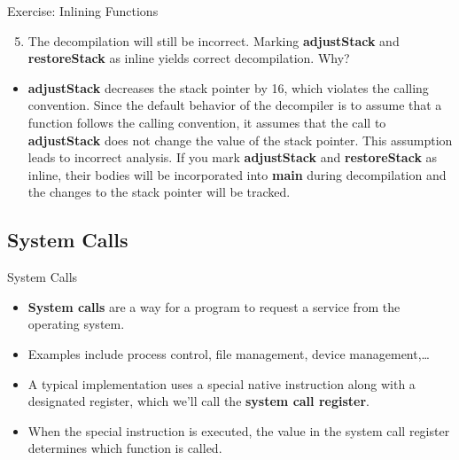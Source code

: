 \documentclass{beamer}
\begin{document}
\begin{frame}
\begin{block}{Exercise: Inlining Functions}
\begin{enumerate}
\setcounter{enumi}{4}
\item The decompilation will still be incorrect. Marking \textbf{adjustStack} and \textbf{restoreStack} as inline yields correct decompilation.  Why?
\end{enumerate}
\pause
\begin{itemize}
\item \textbf{adjustStack} decreases the stack pointer by 16, which violates the calling convention.  Since the default behavior of the decompiler is to assume that a function follows the
calling convention, it assumes that the call to \textbf{adjustStack} does not change the value of the stack pointer. This assumption leads to incorrect analysis. If you mark
\textbf{adjustStack} and \textbf{restoreStack} as inline, their bodies will be incorporated into \textbf{main} during decompilation and the changes to the stack pointer will be tracked.
\end{itemize}
\end{block}
\end{frame}

\subsection{System Calls}
\begin{frame}
\begin{block}{System Calls}
\begin{itemize}
\item \textbf{System calls} are a way for a program to request a service from the operating system.
\item Examples include process control, file management, device management,\ldots
\item A typical implementation uses a special native instruction along with a designated register, which we'll call the
\textbf{system call register}.
\item When the special instruction is executed, the value in the system call register determines which function is called.
\end{itemize}
\end{block}
\end{frame}
\end{document}
